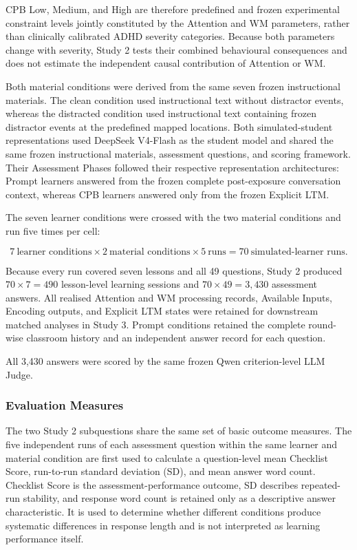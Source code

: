 CPB Low, Medium, and High are therefore predefined and frozen experimental constraint levels jointly constituted by the Attention and WM parameters, rather than clinically calibrated ADHD severity categories. Because both parameters change with severity, Study 2 tests their combined behavioural consequences and does not estimate the independent causal contribution of Attention or WM.

Both material conditions were derived from the same seven frozen instructional materials. The clean condition used instructional text without distractor events, whereas the distracted condition used instructional text containing frozen distractor events at the predefined mapped locations. Both simulated-student representations used DeepSeek V4-Flash as the student model and shared the same frozen instructional materials, assessment questions, and scoring framework. Their Assessment Phases followed their respective representation architectures: Prompt learners answered from the frozen complete post-exposure conversation context, whereas CPB learners answered only from the frozen Explicit LTM.

The seven learner conditions were crossed with the two material conditions and run five times per cell:

{\setlength{\abovedisplayskip}{6pt}
\setlength{\belowdisplayskip}{6pt}
\[
7\ \text{learner conditions}
\times 2\ \text{material conditions}
\times 5\ \text{runs}
=70\ \text{simulated-learner runs}.
\]
}

Because every run covered seven lessons and all 49 questions, Study 2 produced $70\times7=490$ lesson-level learning sessions and $70\times49=3{,}430$ assessment answers. All realised Attention and WM processing records, Available Inputs, Encoding outputs, and Explicit LTM states were retained for downstream matched analyses in Study 3. Prompt conditions retained the complete round-wise classroom history and an independent answer record for each question.

All 3,430 answers were scored by the same frozen Qwen criterion-level LLM Judge.

\subsubsection{Evaluation Measures}
\label{subsubsec:study2-measures}

The two Study 2 subquestions share the same set of basic outcome measures. The five independent runs of each assessment question within the same learner and material condition are first used to calculate a question-level mean Checklist Score, run-to-run standard deviation (SD), and mean answer word count. Checklist Score is the assessment-performance outcome, SD describes repeated-run stability, and response word count is retained only as a descriptive answer characteristic. It is used to determine whether different conditions produce systematic differences in response length and is not interpreted as learning performance itself.

